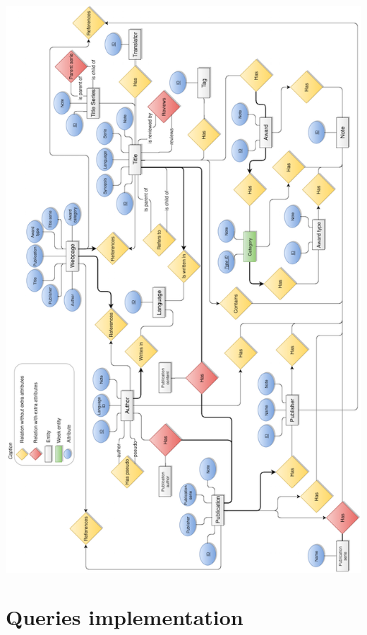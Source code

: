 \documentclass[doubleside, titlepage]{article}
\begin{document}
\begin{center}
    \includegraphics[scale = 0.5]{DBMS_ER_NEW}
\end{center}

\newpage
\section{Queries implementation}
\end{document}

